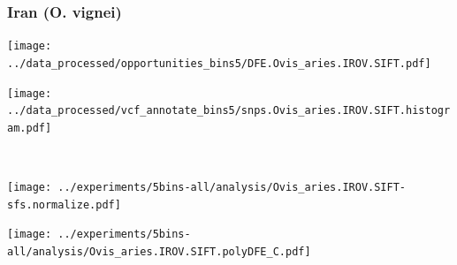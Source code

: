 \subsubsection{Iran (O. vignei)}

\begin{minipage}{0.49\linewidth}
    \texttt{[image: ../data\_processed/opportunities\_bins5/DFE.Ovis\_aries.IROV.SIFT.pdf]}
\end{minipage}
\begin{minipage}{0.49\linewidth}
    \texttt{[image: ../data\_processed/vcf\_annotate\_bins5/snps.Ovis\_aries.IROV.SIFT.histogram.pdf]}
\end{minipage}
\\
\begin{minipage}{0.49\linewidth}
    \texttt{[image: ../experiments/5bins-all/analysis/Ovis\_aries.IROV.SIFT-sfs.normalize.pdf]}
\end{minipage}
\begin{minipage}{0.4\linewidth}
    \texttt{[image: ../experiments/5bins-all/analysis/Ovis\_aries.IROV.SIFT.polyDFE\_C.pdf]}
\end{minipage}

